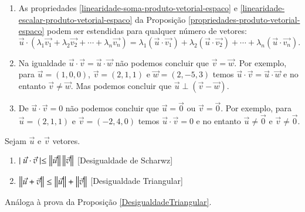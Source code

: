 \begin{observacao}
  \begin{enumerate}[label=({\alph*})]
    \item As propriedades \ref{linearidade-soma-produto-vetorial-espaco} e \ref{linearidade-escalar-produto-vetorial-espaco} da Proposi\c{c}\~ao \ref{propriedades-produto-vetorial-espaco} podem ser estendidas para qualquer n\'umero de vetores:
    \[
      \vec{u}\cdot(\lambda_1\vec{v_1} + \lambda_2\vec{v_2} + \cdots + \lambda_n\vec{v_n} ) = \lambda_1(\vec{u}\cdot\vec{v_1}) + \lambda_2(\vec{u}\cdot\vec{v_2}) + \cdots + \lambda_n(\vec{u}\cdot\vec{v_n}).
    \]
    \item Na igualdade $\vec{u}\cdot\vec{v} = \vec{u}\cdot\vec{w}$ n\~ao podemos concluir que $\vec{v} = \vec{w}$. Por exemplo, para $\vec{u} = (1, 0, 0)$, $\vec{v} = (2, 1, 1)$ e $\vec{w} = (2, -5, 3)$ temos $\vec{u}\cdot\vec{v} = \vec{u}\cdot\vec{w}$ e no entanto $\vec{v} \ne \vec{w}$. Mas podemos concluir que $\vec{u}\perp(\vec{v} - \vec{w})$.
    \item De $\vec{u}\cdot\vec{v} = 0$ n\~ao podemos concluir que $\vec{u} = \vec{0}$ ou $\vec{v} = \vec{0}$. Por exemplo, para $\vec{u} = (2, 1, 1)$ e $\vec{v} = (-2, 4, 0)$ temos $\vec{u}\cdot\vec{v} = 0$ e no entanto $\vec{u} \ne \vec{0}$ e $\vec{v} \ne \vec{0}$.
  \end{enumerate}
\end{observacao}

\begin{proposicao}Sejam $\vec{u}$ e $\vec{v}$ vetores.
  \begin{enumerate}
    \item $\mid\vec{u}\cdot\vec{v}\mid \le \left\Vert{\vec{u}}\right\Vert\left\Vert{\vec{v}}\right\Vert$ [Desigualdade de Scharwz]
    \item $\left\Vert{\vec{u} + \vec{v}}\right\Vert \le \left\Vert{\vec{u}}\right\Vert + \left\Vert{\vec{v}}\right\Vert$ [Desigualdade Triangular]
  \end{enumerate}
\end{proposicao}
\begin{prova}
  An\'aloga \`a prova da Proposi\c{c}\~ao \ref{DesigualdadeTriangular}.
\end{prova}


